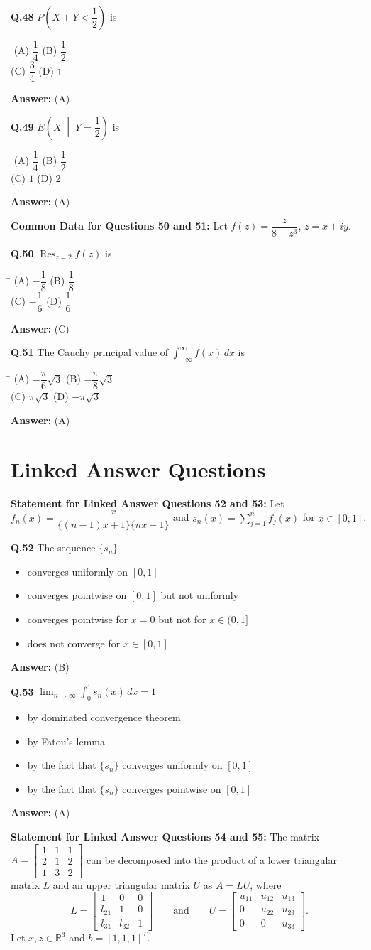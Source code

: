 \documentclass[11pt,a4paper]{article}
\newcommand{\optsfourA}[4]{%
  \begin{tabbing}
    \hspace{0.48\linewidth}\=\kill
    (A) #1 \> (B) #2 \\[2pt]
    (C) #3 \> (D) #4
  \end{tabbing}%
}
\newcommand{\optslistA}[4]{%
  \begin{itemize}
    \setlength{\itemsep}{2pt}\setlength{\parskip}{0pt}
    \item[(A)] #1
    \item[(B)] #2
    \item[(C)] #3
    \item[(D)] #4
  \end{itemize}%
}
\newcommand{\ans}[1]{\textbf{Answer:} #1\par\medskip}
\begin{document}
\textbf{Q.48} $P\!\left(X + Y < \dfrac{1}{2}\right)$ is
\optsfourA{$\dfrac{1}{4}$}{$\dfrac{1}{2}$}{$\dfrac{3}{4}$}{$1$}
\ans{(A)}

\textbf{Q.49} $E\!\left(X \;\middle|\; Y = \dfrac{1}{2}\right)$ is
\optsfourA{$\dfrac{1}{4}$}{$\dfrac{1}{2}$}{$1$}{$2$}
\ans{(A)}

\medskip
\textbf{Common Data for Questions 50 and 51:}
Let $f(z) = \dfrac{z}{8 - z^3}$, $z = x + iy$.

\textbf{Q.50} $\operatorname{Res}_{z=2} f(z)$ is
\optsfourA{$-\dfrac{1}{8}$}{$\dfrac{1}{8}$}{$-\dfrac{1}{6}$}{$\dfrac{1}{6}$}
\ans{(C)}

\textbf{Q.51} The Cauchy principal value of $\displaystyle\int_{-\infty}^{\infty} f(x)\,dx$ is
\optsfourA{$-\dfrac{\pi}{6}\sqrt{3}$}{$-\dfrac{\pi}{8}\sqrt{3}$}{$\pi\sqrt{3}$}{$-\pi\sqrt{3}$}
\ans{(A)}

\section*{Linked Answer Questions}

\textbf{Statement for Linked Answer Questions 52 and 53:}
Let $f_n(x) = \dfrac{x}{\{(n - 1)x + 1\}\{nx + 1\}}$ and $s_n(x) = \displaystyle\sum_{j=1}^{n} f_j(x)$ for $x \in [0, 1]$.

\textbf{Q.52} The sequence $\{s_n\}$
\optslistA{converges uniformly on $[0, 1]$}{converges pointwise on $[0, 1]$ but not uniformly}{converges pointwise for $x = 0$ but not for $x \in (0, 1]$}{does not converge for $x \in [0, 1]$}
\ans{(B)}

\textbf{Q.53} $\displaystyle\lim_{n\to\infty} \int_0^1 s_n(x)\,dx = 1$
\optslistA{by dominated convergence theorem}{by Fatou's lemma}{by the fact that $\{s_n\}$ converges uniformly on $[0, 1]$}{by the fact that $\{s_n\}$ converges pointwise on $[0, 1]$}
\ans{(A)}

\medskip
\textbf{Statement for Linked Answer Questions 54 and 55:}
The matrix $A = \begin{bmatrix} 1 & 1 & 1 \\ 2 & 1 & 2 \\ 1 & 3 & 2 \end{bmatrix}$ can be decomposed into the product of a lower triangular matrix $L$ and an upper triangular matrix $U$ as $A = LU$, where
\[
  L = \begin{bmatrix} 1 & 0 & 0 \\ l_{21} & 1 & 0 \\ l_{31} & l_{32} & 1 \end{bmatrix}
  \qquad \text{and} \qquad
  U = \begin{bmatrix} u_{11} & u_{12} & u_{13} \\ 0 & u_{22} & u_{23} \\ 0 & 0 & u_{33} \end{bmatrix}.
\]
Let $x, z \in \mathbb{R}^3$ and $b = [1, 1, 1]^T$.
\end{document}
